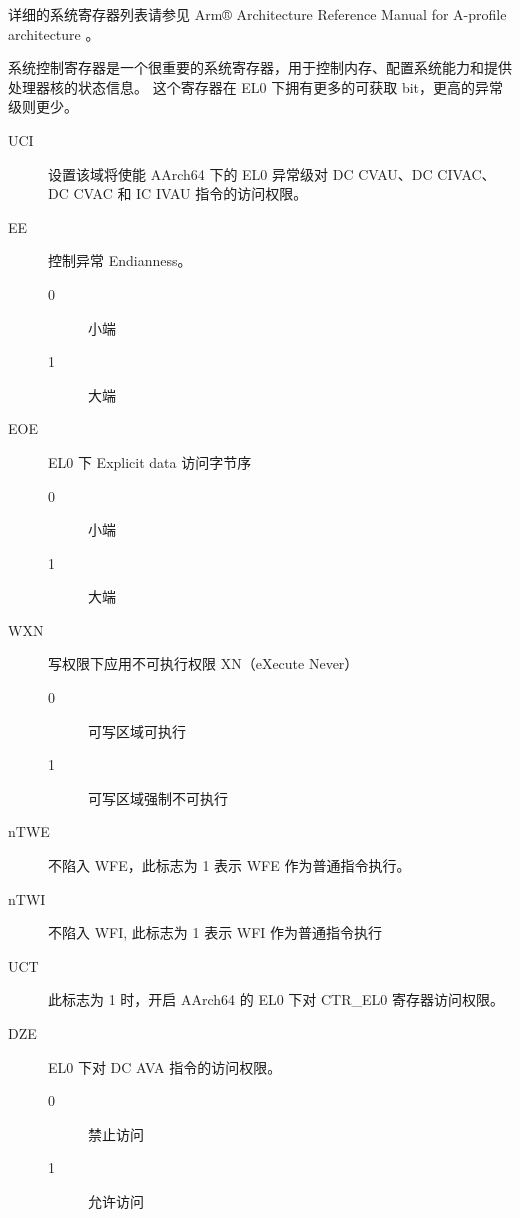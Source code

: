 详细的系统寄存器列表请参见 Arm® Architecture Reference Manual for A-profile architecture \cite{armrefman}。


系统控制寄存器是一个很重要的系统寄存器，用于控制内存、配置系统能力和提供处理器核的状态信息。
这个寄存器在 EL0 下拥有更多的可获取 bit，更高的异常级则更少。


\begin{description}
  \item[UCI] 设置该域将使能 AArch64 下的 EL0 异常级对 DC CVAU、DC CIVAC、DC CVAC 和 IC IVAU 指令的访问权限。
  \item[EE] 控制异常 Endianness。
    \begin{description}
      \item[0] 小端 
      \item[1] 大端
    \end{description}
  \item[EOE] EL0 下 Explicit data 访问字节序
    \begin{description}
      \item[0] 小端 
      \item[1] 大端
    \end{description}
  \item[WXN] 写权限下应用不可执行权限 XN（eXecute Never）
    \begin{description}
      \item[0] 可写区域可执行
      \item[1] 可写区域强制不可执行
    \end{description}
  \item[nTWE] 不陷入 WFE，此标志为 1 表示 WFE 作为普通指令执行。
  \item[nTWI] 不陷入 WFI, 此标志为 1 表示 WFI 作为普通指令执行
  \item[UCT] 此标志为 1 时，开启 AArch64 的 EL0 下对 CTR\_EL0 寄存器访问权限。
  \item[DZE] EL0 下对 DC AVA 指令的访问权限。
    \begin{description}
      \item[0] 禁止访问
      \item[1] 允许访问
    \end{description}

\end{description}
